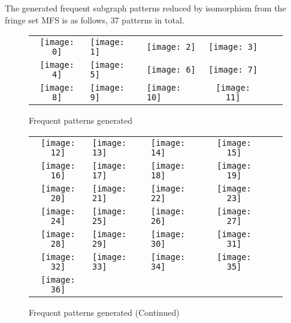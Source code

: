 \documentclass[a4paper, 12pt]{report}
\begin{document}
The generated frequent subgraph patterns reduced by isomorphism from the fringe set MFS is as follows, 37 patterns in total.
\begin{figure}[H]
\centering
    \begin{tabular}{c p{3cm}p{3cm}clc} 
            \texttt{[image: 0]}&
            \texttt{[image: 1]}&
            \texttt{[image: 2]}&
            \texttt{[image: 3]}\\
            \texttt{[image: 4]}&
            \texttt{[image: 5]}&
            \texttt{[image: 6]}&
            \texttt{[image: 7]}\\
            \texttt{[image: 8]}&
            \texttt{[image: 9]}&
            \texttt{[image: 10]}&
            \texttt{[image: 11]}\\
    \end{tabular}
    \caption{Frequent patterns generated}
\end{figure}
\begin{figure}[H]
\centering
    \begin{tabular}{c p{3cm}p{3cm}clc} 
            \texttt{[image: 12]}&
            \texttt{[image: 13]}&
            \texttt{[image: 14]}&
            \texttt{[image: 15]}\\
            \texttt{[image: 16]}&
            \texttt{[image: 17]}&
            \texttt{[image: 18]}&
            \texttt{[image: 19]}\\
            \texttt{[image: 20]}&
            \texttt{[image: 21]}&
            \texttt{[image: 22]}&
            \texttt{[image: 23]}\\
            \texttt{[image: 24]}&
            \texttt{[image: 25]}&
            \texttt{[image: 26]}&
            \texttt{[image: 27]}\\
            \texttt{[image: 28]}&
            \texttt{[image: 29]}&
            \texttt{[image: 30]}&
            \texttt{[image: 31]}\\
            \texttt{[image: 32]}&
            \texttt{[image: 33]}&
            \texttt{[image: 34]}&
            \texttt{[image: 35]}\\
            \texttt{[image: 36]}&

    \end{tabular}
    \caption{Frequent patterns generated (Continued)}
\end{figure}
\end{document}
